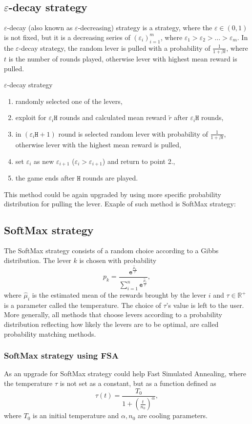 \documentclass[11pt,american,czech]{article}
\newcommand{\e}{\mathtt{e}} %
\newcommand{\R}{\mathbb{R}} %
\begin{document}
	\subsection*{$\varepsilon$-decay strategy}
	$\varepsilon$-decay (also known as $\varepsilon$-decreasing) strategy is a strategy, where the $\varepsilon\in(0,1)$ is not fixed, but it is a decreasing series of $(\varepsilon_i)_{i=1}^m$, where $\varepsilon_1>\varepsilon_2>\dots>\varepsilon_m$. In the $\varepsilon$-decay strategy, the random lever is pulled with a probability of $\frac{1}{1+\beta t}$, where $t$ is the number of rounds played, otherwise lever with highest mean reward is pulled.
	\begin{tcolorbox}[colframe=white]
		$\varepsilon$-decay strategy
		\begin{enumerate}
			\item randomly selected one of the levers,
			\item exploit for $\varepsilon_i\mathtt{H}$ rounds and calculated mean reward $\tilde{r}$ after $\varepsilon_i\mathtt{H}$ rounds,
			\item in $(\varepsilon_i\mathtt{H}+1)$ round is selected random lever with probability of $\frac{1}{1+\beta t}$, otherwise lever with the highest mean reward is pulled,
			\item set $\varepsilon_i$ as new $\varepsilon_{i+1}$ ($\varepsilon_i>\varepsilon_{i+1}$) and return to point 2.,
			\item the game ends after $\mathtt{H}$ rounds are played.
		\end{enumerate}
	\end{tcolorbox}
	This method could be again upgraded by using more specific probability distribution for pulling the lever. Exaple of such method is SoftMax strategy: 
	\subsection*{SoftMax strategy}
	The SoftMax strategy consists of a random choice according to a Gibbs distribution. The lever $k$ is chosen with probability 
	$$p_k =\frac{\e^{\frac{\hat{\mu}_k}{\tau}}}{\sum_{i=1}^{n}\e^{\frac{\hat{\mu}_i}{\tau}}},$$
	where $\hat{\mu}_i$ is the estimated mean of the rewards brought by the lever $i$ and $\tau\in\R^+$ is a parameter called the temperature. The choice of $\tau$’s value is left to the user. More generally, all methods that choose levers according to a probability distribution reflecting how likely the levers are to be optimal, are called probability matching methods.
	\subsubsection*{SoftMax strategy using FSA}
	As an upgrade for SoftMax strategy could help Fast Simulated Annealing, where the temperature $\tau$ is not set as a constant, but as a function defined as $$\tau(t) = \frac{T_0}{1+(\frac{t}{n_0})^\alpha},$$ where $T_0$ is an initial temperature and $\alpha, n_0$ are cooling parameters.	
	
\end{document}
